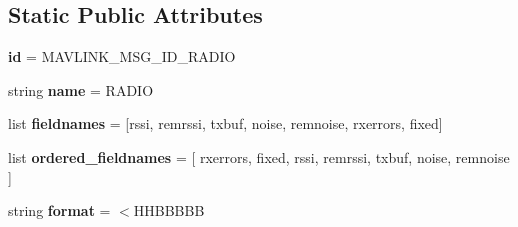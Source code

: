 \subsection*{Static Public Attributes}
\begin{DoxyCompactItemize}
\item 
\mbox{\label{classpymavlink_1_1dialects_1_1v10_1_1MAVLink__radio__message_ad1735c1262d8e459d460740342719db1}} 
{\bfseries id} = M\+A\+V\+L\+I\+N\+K\+\_\+\+M\+S\+G\+\_\+\+I\+D\+\_\+\+R\+A\+D\+IO
\item 
\mbox{\label{classpymavlink_1_1dialects_1_1v10_1_1MAVLink__radio__message_ab9b4ddc23d4c4327992c58affb93e2cb}} 
string {\bfseries name} = \textquotesingle{}R\+A\+D\+IO\textquotesingle{}
\item 
\mbox{\label{classpymavlink_1_1dialects_1_1v10_1_1MAVLink__radio__message_a91ac1612bc5687ceb9019787e2624607}} 
list {\bfseries fieldnames} = \mbox{[}\textquotesingle{}rssi\textquotesingle{}, \textquotesingle{}remrssi\textquotesingle{}, \textquotesingle{}txbuf\textquotesingle{}, \textquotesingle{}noise\textquotesingle{}, \textquotesingle{}remnoise\textquotesingle{}, \textquotesingle{}rxerrors\textquotesingle{}, \textquotesingle{}fixed\textquotesingle{}\mbox{]}
\item 
\mbox{\label{classpymavlink_1_1dialects_1_1v10_1_1MAVLink__radio__message_ada90ae15e0620ec748fabe8d89df07fb}} 
list {\bfseries ordered\+\_\+fieldnames} = \mbox{[} \textquotesingle{}rxerrors\textquotesingle{}, \textquotesingle{}fixed\textquotesingle{}, \textquotesingle{}rssi\textquotesingle{}, \textquotesingle{}remrssi\textquotesingle{}, \textquotesingle{}txbuf\textquotesingle{}, \textquotesingle{}noise\textquotesingle{}, \textquotesingle{}remnoise\textquotesingle{} \mbox{]}
\item 
\mbox{\label{classpymavlink_1_1dialects_1_1v10_1_1MAVLink__radio__message_ad747aa032fcd1a35164fdbb4669dcfdb}} 
string {\bfseries format} = \textquotesingle{}$<$H\+H\+B\+B\+B\+BB\textquotesingle{}
\item 

\end{DoxyCompactItemize}
